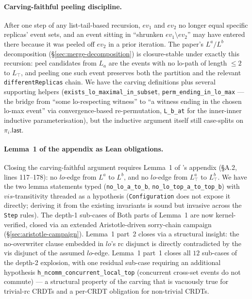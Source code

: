 \documentclass[11pt,a4paper]{article}
\theoremstyle{definition}
\theoremstyle{remark}
\newcommand{\ev}{\mathit{ev}}
\begin{document}
\paragraph{Carving-faithful peeling discipline.}
After one step of any list-tail-based recursion, $\ev_1$ and
$\ev_2$ no longer equal specific replicas' event sets, and an
event sitting in ``shrunken $\ev_1 \setminus \ev_2$'' may have
entered there because it was peeled off $\ev_2$ in a prior
iteration. The paper's $L^a / L^b$ decomposition
(\S\ref{sec:merge-decomposition}) is closure-stable under exactly
this recursion: peel candidates from $L_a$ are the events with no
lo-path of length $\le 2$ to $L_\top$, and peeling one such event
preserves both the partition and the relevant
\texttt{differentReplicas} chain. We have the carving definitions
plus several supporting helpers
(\texttt{exists\_lo\_maximal\_in\_subset},
\texttt{perm\_ending\_in\_lo\_max} —
the bridge from ``some lo-respecting witness'' to ``a witness
ending in the chosen lo-max event'' via convergence-based
re-permutation, \texttt{L\_b\_at} for the inner-inner inductive
parameterisation), but the inductive argument itself still
case-splits on $\pi_i.\mathsf{last}$.

\paragraph{Lemma~1 of the appendix as Lean obligations.}
Closing the carving-faithful argument requires Lemma~1 of
\cite{sal2025}'s appendix (\S A.2, lines 117--178): no
$\mathit{lo}$-edge from $L^a$ to $L^b$, and no
$\mathit{lo}$-edge from $L_\top^a$ to $L_\top^b$. We have the
two lemma statements typed (\texttt{no\_lo\_a\_to\_b},
\texttt{no\_lo\_top\_a\_to\_top\_b}) with $\mathit{vis}$-transitivity
threaded as a hypothesis (\texttt{Configuration} does not expose it
directly; deriving it from the existing invariants is sound but
invasive across the \texttt{Step} rules). The depth-1 sub-cases of
Both parts of Lemma~1 are now kernel-verified, closed via an
extended Aristotle-driven sorry-chain campaign
(\S\ref{sec:aristotle-campaign}). Lemma~1 part~2 closes via a
structural insight: the no-overwriter clause embedded in
$\mathit{lo}$'s rc disjunct is directly contradicted by the vis
disjunct of the assumed $\mathit{lo}$-edge. Lemma~1 part~1 closes
all $12$ sub-cases of the depth-2 explosion, with one residual
sub-case requiring an additional hypothesis
\texttt{h\_ncomm\_concurrent\_local\_top} (concurrent cross-set
events do not commute) — a structural property of the carving
that is vacuously true for trivial-rc CRDTs and a per-CRDT
obligation for non-trivial CRDTs.
\end{document}

